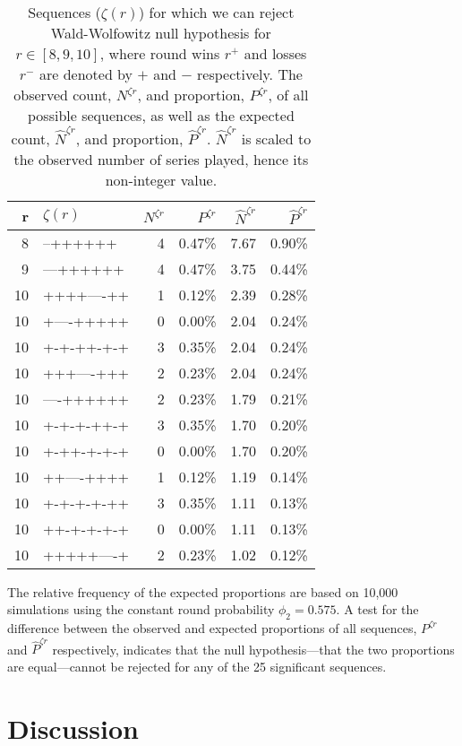 \documentclass{article}
\begin{document}
\begin{longtable}{rlrrrr}

\caption{Sequences ($\zeta(r)$) for which we can reject Wald-Wolfowitz null hypothesis for $r \in [8, 9, 10]$, where round wins $r^+$ and losses $r^-$ are denoted by $+$ and $-$ respectively. The observed count, $N^{\zeta r}$, and proportion, $P^{\zeta r}$, of all possible sequences, as well as the expected count, $\hat{N}^{\zeta r}$, and proportion, $\hat{P}^{\zeta r}$. $\hat{N}^{\zeta r}$ is scaled to the observed number of series played, hence its non-integer value.}
\label{tbl:cod-runs} \\

\toprule
r & $\zeta(r)$ & $N^{\zeta r}$ & $P^{\zeta r}$ & $\hat{N}^{\zeta r}$ & $\hat{P}^{\zeta r}$ \\ 
\midrule
8 & --++++++ & 4 & 0.47\% & 7.67 & 0.90\% \\ 
9 & ---++++++ & 4 & 0.47\% & 3.75 & 0.44\% \\ 
10 & ++++----++ & 1 & 0.12\% & 2.39 & 0.28\% \\ 
10 & +----+++++ & 0 & 0.00\% & 2.04 & 0.24\% \\ 
10 & +-+-++-+-+ & 3 & 0.35\% & 2.04 & 0.24\% \\ 
10 & +++----+++ & 2 & 0.23\% & 2.04 & 0.24\% \\ 
10 & ----++++++ & 2 & 0.23\% & 1.79 & 0.21\% \\ 
10 & +-+-+-++-+ & 3 & 0.35\% & 1.70 & 0.20\% \\ 
10 & +-++-+-+-+ & 0 & 0.00\% & 1.70 & 0.20\% \\ 
10 & ++----++++ & 1 & 0.12\% & 1.19 & 0.14\% \\ 
10 & +-+-+-+-++ & 3 & 0.35\% & 1.11 & 0.13\% \\ 
10 & ++-+-+-+-+ & 0 & 0.00\% & 1.11 & 0.13\% \\ 
10 & +++++----+ & 2 & 0.23\% & 1.02 & 0.12\% \\ 
\bottomrule
\end{longtable}

The relative frequency of the expected proportions are based on 10,000
simulations using the constant round probability \(\phi_2 = 0.575\). A
test for the difference between the observed and expected proportions of
all sequences, \(P^{\zeta r}\) and \(\hat{P}^{\zeta r}\) respectively,
indicates that the null hypothesis---that the two proportions are
equal---cannot be rejected for any of the 25 significant sequences.

\hypertarget{discussion}{%
\section{Discussion}\label{discussion}}
\end{document}
